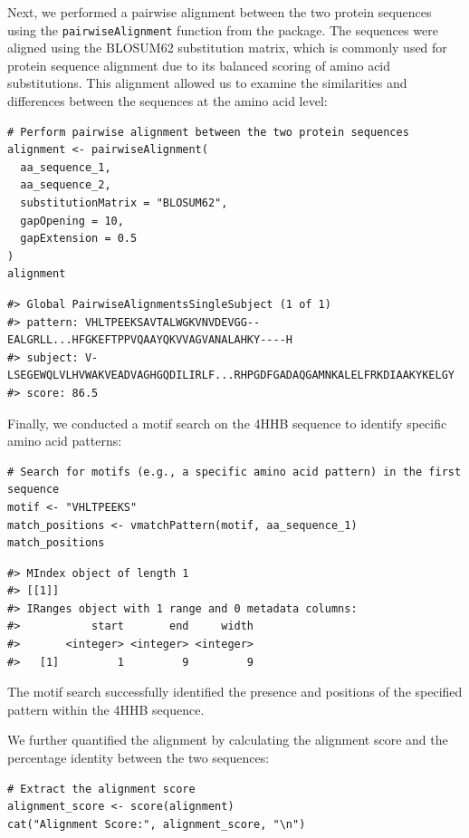 Next, we performed a pairwise alignment between the two protein sequences using the \texttt{pairwiseAlignment} function from the  package. The sequences were aligned using the BLOSUM62 substitution matrix, which is commonly used for protein sequence alignment due to its balanced scoring of amino acid substitutions. This alignment allowed us to examine the similarities and differences between the sequences at the amino acid level:

\begin{verbatim}
# Perform pairwise alignment between the two protein sequences
alignment <- pairwiseAlignment(
  aa_sequence_1,
  aa_sequence_2,
  substitutionMatrix = "BLOSUM62",
  gapOpening = 10,
  gapExtension = 0.5
)
alignment
\end{verbatim}

\begin{verbatim}
#> Global PairwiseAlignmentsSingleSubject (1 of 1)
#> pattern: VHLTPEEKSAVTALWGKVNVDEVGG--EALGRLL...HFGKEFTPPVQAAYQKVVAGVANALAHKY----H
#> subject: V-LSEGEWQLVLHVWAKVEADVAGHGQDILIRLF...RHPGDFGADAQGAMNKALELFRKDIAAKYKELGY
#> score: 86.5
\end{verbatim}

Finally, we conducted a motif search on the 4HHB sequence to identify specific amino acid patterns:

\begin{verbatim}
# Search for motifs (e.g., a specific amino acid pattern) in the first sequence
motif <- "VHLTPEEKS"
match_positions <- vmatchPattern(motif, aa_sequence_1)
match_positions
\end{verbatim}

\begin{verbatim}
#> MIndex object of length 1
#> [[1]]
#> IRanges object with 1 range and 0 metadata columns:
#>           start       end     width
#>       <integer> <integer> <integer>
#>   [1]         1         9         9
\end{verbatim}

The motif search successfully identified the presence and positions of the specified pattern within the 4HHB sequence.

We further quantified the alignment by calculating the alignment score and the percentage identity between the two sequences:

\begin{verbatim}
# Extract the alignment score
alignment_score <- score(alignment)
cat("Alignment Score:", alignment_score, "\n")
\end{verbatim}

